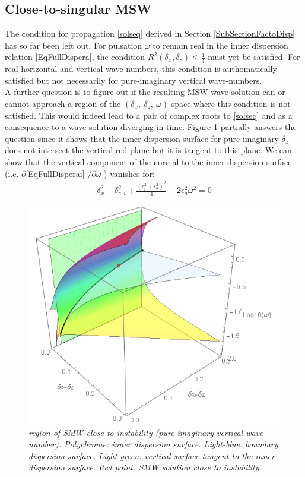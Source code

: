 \documentclass[a4paper,11pt]{article}
\begin{document}



\subsection{Close-to-singular MSW}

The condition for propagation \ref{solseq} derived in Section \ref{SubSectionFactoDisp} has so far been left out. For pulsation $\omega$ to remain real in the inner dispersion relation \ref{EqFullDispera}, the condition $\displaystyle R^2(\delta_x,\delta_z)\le \frac{1}{4}$ must yet be satisfied. For real horizontal and vertical wave-numbers, this condition is authomatically satisfied but not necessarily for pure-imaginary vertical wave-numbers.\\
A further question is to figure out if the resulting MSW wave solution can or cannot approach a region of the $(\delta_x,\ \delta_z,\ \omega)$ space where this condition is not satisfied. This would indeed lead to a pair of complex roots to \ref{solseq} and as a consequence to a wave solution diverging in time. Figure \ref{FigDelta} partially answers the question since it shows that the inner dispersion surface for pure-imaginary $\delta_z$ does not intersect the vertical red plane but it is tangent to this plane. We can show that the vertical component of the normal to the inner dispersion surface (i.e. $\partial$\ref{EqFullDisperai} $/\partial \omega$ ) vanishes for:
\begin{subequations}
	\begin{alignat}{2}	
		 \delta_x^2 - \delta_{z,i} ^2 
		+\frac{(\epsilon_i^2+\epsilon_a^2)^2}{4}
		-2 \epsilon_a^2 \omega^2 = 0
		\label{EqTurnPoints}
	\end{alignat}
\end{subequations}
	
\begin{figure}[!h]
	\centering		
	\includegraphics[width=0.5\linewidth]{FIGURES/Fig_Delta.png}
	\caption{\textit{region of SMW close to instability (pure-imaginary vertical wave-number). Polychrome: inner dispersion surface. Light-blue: boundary dispersion surface. Light-green: vertical surface tangent to the inner dispersion surface. Red point: SMW solution close to instability. }}
	\label{FigDelta}
\end{figure}
\end{document}

